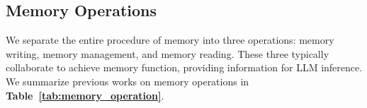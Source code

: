 \documentclass{article}
\theoremstyle{definition}
\theoremstyle{theorem}
\theoremstyle{proof}
\theoremstyle{remark}
\begin{document}
	\subsection{Memory Operations}
	We separate the entire procedure of memory into three operations: memory writing, memory management, and memory reading. These three typically collaborate to achieve memory function, providing information for LLM inference.
	We summarize previous works on memory operations in \textbf{Table~\ref{tab:memory_operation}}.
	
	\begin{table}[tbp]
		\centering
		\caption{
			Summarization of the memory operations.
			If a model does not have special designs on the memory operations, we use $\circ$ to label it, otherwise, it is denoted by $\checkmark$.
			\texttimes~means that the memory operations are not discussed in the paper.
		}
		\vspace{0.05cm}
\end{table}
\end{document}
